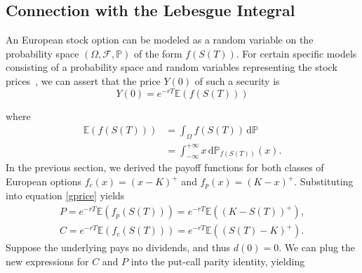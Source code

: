 \documentclass[]{article}
\newcommand{\EE}{\mathbb{E}}
\newcommand{\PP}{\mathbb{P}}
\theoremstyle{definition}
\theoremstyle{remark}
\begin{document}
\subsection{Connection with the Lebesgue Integral}
An European stock option can be modeled as a random variable on the probability space $(\Omega, \mathcal{F}, \PP)$ of the form $f(S(T))$. For certain specific models consisting of a probability space and random variables representing the stock prices~\cite{capinski2004measure}, we can assert that the price $Y(0)$ of such a security is
\begin{equation} \label{gprice}
	Y(0) = e^{-rT} \EE(f(S(T)))
\end{equation}

where
\begin{align*}
\EE(f(S(T))) &= \int_\Omega f(S(T))  \, \text{d} \PP \\
&= \int_{- \infty}^{+ \infty} x \,\text{d} \PP_{f(S(T))}(x).
\end{align*}
In the previous section, we derived the payoff functions for both classes of European options $f_c (x) = (x - K)^+$ and $f_p (x) = (K - x)^+$. Substituting into equation \ref{gprice} yields
\begin{gather*}
	P = e^{-rT} \EE(f_p(S(T))) =e^{-rT}  \EE((K - S(T))^+), \\
	C = e^{-rT} \EE(f_c(S(T))) =  e^{-rT} \EE((S(T) - K)^+).
\end{gather*}
Suppose the underlying pays no dividends, and thus $d(0)=0$. We can plug the new expressions for $C$ and $P$ into the put-call parity identity, yielding
\end{document}
